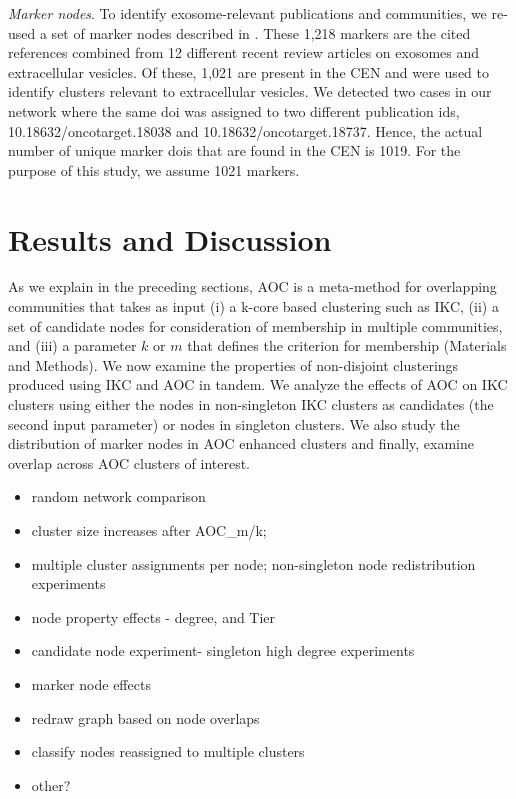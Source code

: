 \documentclass[12pt, oneside]{article}   	%
\begin{document}
\emph{Marker nodes}. To identify exosome-relevant publications and communities, we re-used a set of marker nodes described in  \citep{Wedell2022}. These 1,218 markers are the cited references combined from 12 different recent review articles on exosomes and extracellular vesicles. Of these, 1,021 are present in the CEN and  were used to identify clusters relevant to extracellular vesicles. We detected two cases in our network where the same doi was assigned to two different publication ids, 10.18632/oncotarget.18038 and 10.18632/oncotarget.18737. Hence, the actual number of unique marker dois that are found in the CEN is 1019. For the purpose of this study, we assume 1021 markers.

\section{Results and Discussion}

As we explain in the preceding sections, AOC is a meta-method for overlapping communities that takes as input (i) a k-core based clustering such as IKC, (ii) a set of candidate nodes for consideration of membership in multiple communities, and (iii) a parameter $k$ or $m$ that defines the criterion for membership (Materials and Methods). We now examine the properties of non-disjoint clusterings produced using IKC and AOC in tandem. We analyze the effects of AOC on IKC clusters using either the nodes in non-singleton IKC clusters as candidates (the second input parameter) or nodes in singleton clusters. We also study the distribution of marker nodes in AOC enhanced clusters and finally, examine overlap across AOC clusters of interest. 

\begin{itemize}
\item random network comparison
\item cluster size increases after AOC\_m/k; 
\item multiple cluster assignments per node; non-singleton node redistribution experiments
\item node property effects - degree, and Tier
\item candidate node experiment- singleton high degree experiments
\item marker node effects
\item redraw graph based on node overlaps
\item classify nodes reassigned to multiple clusters
\item other?
\end{itemize}
\end{document}

